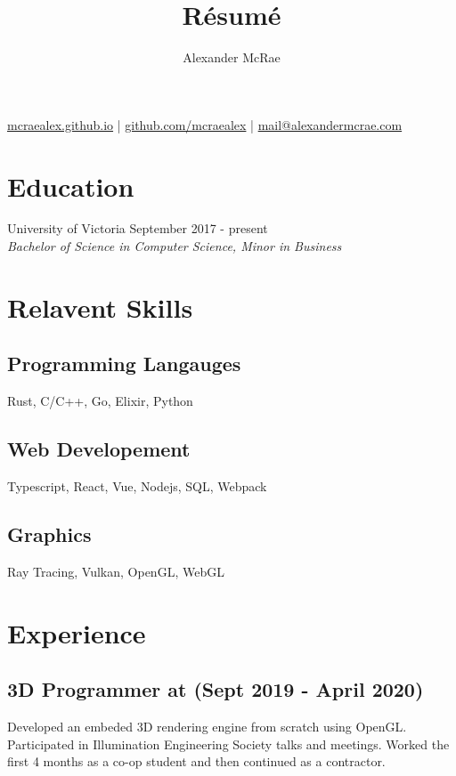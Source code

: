\documentclass{article}
\makeatletter
\renewcommand{\maketitle}{
\begin{center}
{\huge \bfseries \theauthor}

\vspace{0.25em}
\url{mcraealex.github.io} | \url{github.com/mcraealex} | \href{mailto:mail@alexandermcrae.com}{mail@alexandermcrae.com}
\end{center}}
\newcommand{\hrefColored}[3]{\href{#2}{\color{#1}{#3}}}
\makeatother
\begin{document}
\title{R\'esum\'e}
\author{Alexander McRae}

\maketitle

\section{Education}

\noindent University of Victoria \hfill September 2017 - present\\
\textit{Bachelor of Science in Computer Science, Minor in Business}

\section{Relavent Skills}

\subsection{Programming Langauges}

Rust, C/C++, Go, Elixir, Python

\subsection{Web Developement}

Typescript, React, Vue, Nodejs, SQL, Webpack

\subsection{Graphics}

Ray Tracing, Vulkan, OpenGL, WebGL

\section{Experience}

\subsection{3D Programmer at \hrefColored{blue}{https://www.suntrackertech.com}{Suntracker Technologies Ltd.} (Sept 2019 - April 2020)}

Developed an embeded 3D rendering engine from scratch using OpenGL. Participated
in Illumination Engineering Society talks and meetings. Worked the first 4 
months as a co-op student and then continued as a contractor.
\end{document}
